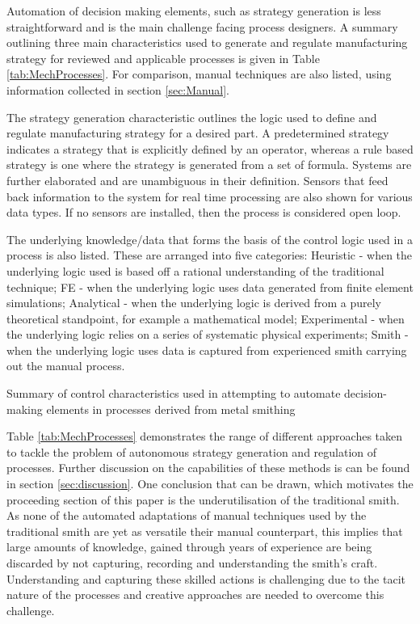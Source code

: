 Automation of decision making elements, such as  strategy generation is less straightforward and is the main challenge facing process designers. A summary outlining three main characteristics used to generate and regulate manufacturing strategy for reviewed and applicable processes is given in Table \ref{tab:MechProcesses}. For comparison, manual techniques are also listed, using information collected in section \ref{sec:Manual}.

The strategy generation characteristic outlines the logic used to define and regulate manufacturing strategy for a desired part. A predetermined strategy indicates a strategy that is explicitly defined by an operator, whereas a rule based strategy is one where the strategy is generated from a set of formula. Systems are further elaborated and are unambiguous in their definition. Sensors that feed back information to the system for real time processing are also shown for various data types. If no sensors are installed, then the process is considered open loop.

The underlying knowledge/data that forms the basis of the control logic used in a process is also listed. These are arranged into five categories: Heuristic - when the underlying logic used is based off a rational understanding of the traditional technique; FE - when the underlying logic uses data generated from finite element simulations; Analytical - when the underlying logic is derived from a purely theoretical standpoint, for example a mathematical model; Experimental - when the underlying logic relies on a series of systematic physical experiments; Smith - when the underlying logic uses data is captured from experienced smith carrying out the manual process.

\renewcommand{\arraystretch}{1.2} 
\begin{table}[h] 
    \centering
    \resizebox{\linewidth}{!}{
        
        }
    \caption{Summary of control characteristics used in attempting to automate decision-making elements  in processes derived from metal smithing}
    \label{tab:MechProcesses}
\end{table}

Table \ref{tab:MechProcesses} demonstrates the range of different approaches taken to tackle the problem of autonomous strategy generation and regulation of processes. Further discussion on the capabilities of these methods is can be found in section \ref{sec:discussion}. One conclusion that can be drawn, which motivates the proceeding section of this paper is the underutilisation  of the traditional smith. As none of the automated adaptations of manual techniques used by the traditional smith are yet as versatile their manual counterpart, this implies that large amounts of knowledge, gained through years of experience are being discarded by not capturing, recording and understanding the smith’s craft. Understanding and capturing these skilled actions is challenging due to the tacit nature of the processes and creative approaches are needed to overcome this challenge.


